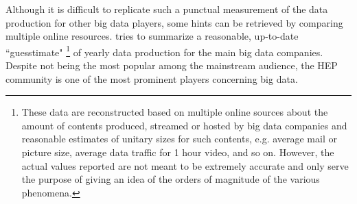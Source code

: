 Although it is difficult to replicate such a punctual measurement of the data production for other big data players, some hints can be retrieved by comparing multiple online resources. %
 tries to summarize a reasonable, up-to-date ``guesstimate"%
\footnote{These data are reconstructed based on multiple online sources about the amount of contents produced, streamed or hosted by big data companies and reasonable estimates of unitary sizes for such contents, e.g. average mail or picture size, average data traffic for 1 hour video, and so on. 
However, the actual values reported are not meant to be extremely accurate and only serve the purpose of giving an idea of the orders of magnitude of the various phenomena.
}
of yearly data production for the main big data companies.
Despite not being the most popular among the mainstream audience, the HEP community is one of the most prominent players concerning big data.
